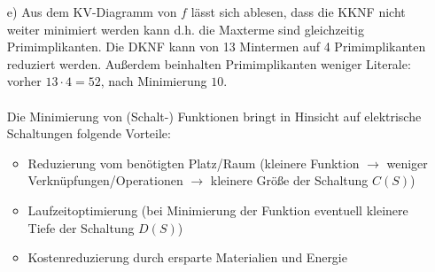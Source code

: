 \documentclass{article}
\begin{document}
\begin{itemize}
\begin{minipage}[h]{0.3\textwidth}
\begin{karnaugh-map}[4][4][1][$x_3x_4$][$x_1x_2$]
			\end{karnaugh-map}
    	\end{minipage}
    	\item[e)]Aus dem KV-Diagramm von $f$ lässt sich ablesen, dass die KKNF nicht weiter minimiert werden kann d.h. die Maxterme sind gleichzeitig Primimplikanten. Die DKNF kann von 13 Mintermen auf 4 Primimplikanten reduziert werden. Außerdem beinhalten Primimplikanten weniger Literale: vorher $13\cdot 4=52$, nach Minimierung $10$.\\\\
    	Die Minimierung von (Schalt-) Funktionen bringt in Hinsicht auf elektrische Schaltungen folgende Vorteile:
    	\begin{itemize}
    		\item Reduzierung vom benötigten Platz/Raum (kleinere Funktion $\rightarrow$ weniger Verknüpfungen/Operationen $\rightarrow$ kleinere Größe der Schaltung $C(S)$)
    		\item Laufzeitoptimierung (bei Minimierung der Funktion eventuell kleinere Tiefe der Schaltung $D(S)$)
    		\item Kostenreduzierung durch ersparte Materialien und Energie 
    	\end{itemize}
    \end{itemize}	
\end{document}
